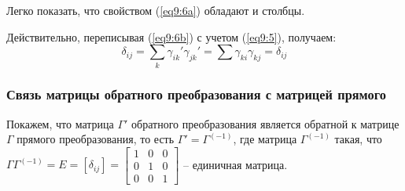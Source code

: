 	\begin{remark}
	Легко показать, что свойством (\ref{eq9:6a}) обладают и столбцы.
	
	Действительно, переписывая (\ref{eq9:6b}) с учетом (\ref{eq9:5}), получаем:
	\begin{equation}
		\delta_{ij} = \sum\limits_k \gamma_{ik}'\gamma_{jk}' = \sum \gamma_{ki}\gamma_{kj} = \delta_{ij} \label{eq9:7}
	\end{equation}
	\end{remark}
	
\subsubsection{Связь матрицы обратного преобразования с матрицей прямого}

	Покажем, что матрица \( \Gamma' \) обратного преобразования является обратной к матрице \( \Gamma \) прямого преобразования, то есть \( \Gamma' = \Gamma^{(-1)} \), где матрица \( \Gamma^{(-1)} \) такая, что \( \Gamma \Gamma^{(-1)} = E = [ \delta_{ij} ] = \left[ \begin{smallmatrix} 1 & 0 & 0 \\ 0 & 1 & 0 \\ 0 & 0 & 1 \end{smallmatrix} \right] \) -- единичная матрица.
	
